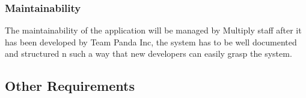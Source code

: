 \documentclass[11pt]{article}
\begin{document}
\subsubsection{Maintainability}
The maintainability of the application will be managed by Multiply staff after it has been developed by Team Panda Inc, the system has to be well documented and structured n such a way that new developers can easily grasp the system.
\subsection{Other Requirements}
\end{document}
